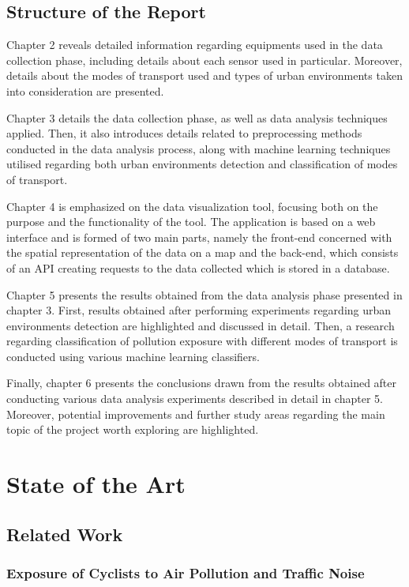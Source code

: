 \documentclass[bsc,frontabs,twoside,singlespacing, parskip,deptreport]{infthesis}     %
\begin{document}
\section{Structure of the Report}

Chapter 2 reveals detailed information regarding equipments used in the data collection phase, including details about each sensor used in particular. Moreover, details about the modes of transport used and types of urban environments taken into consideration are presented.

Chapter 3 details the data collection phase, as well as data analysis techniques applied. Then, it also introduces details related to preprocessing methods conducted in the data analysis process, along with machine learning techniques utilised regarding both urban environments detection and classification of modes of transport.

Chapter 4 is emphasized on the data visualization tool, focusing both on the purpose and the functionality of the tool. The application is based on a web interface and is formed of two main parts, namely the front-end concerned with the spatial representation of the data on a map and the back-end, which consists of an API creating requests to the data collected which is stored in a database.

Chapter 5 presents the results obtained from the data analysis phase presented in chapter 3. First, results obtained after performing experiments regarding urban environments detection are highlighted and discussed in detail. Then, a research regarding classification of pollution exposure with different modes of transport is conducted using various machine learning classifiers.

Finally, chapter 6 presents the conclusions drawn from the results obtained after conducting various data analysis experiments described in detail in chapter 5. Moreover, potential improvements and further study areas regarding the main topic of the project worth exploring are highlighted.

\chapter{State of the Art}

\section{Related Work}
\label{sec:literature-review}

\subsection{Exposure of Cyclists to Air Pollution and Traffic Noise}
\end{document}
